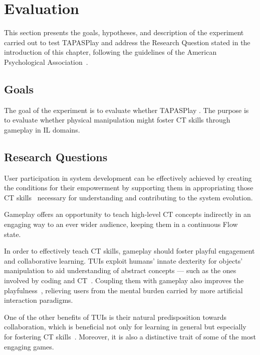 \section{Evaluation}\label{sec:ev5}
This section presents the goals, hypotheses, and description of the experiment carried out to test TAPASPlay and address the Research Question stated in the introduction of this chapter, following the guidelines of the American Psychological Association~\cite{Wohlin:2000:ESE:330775}.

\subsection{Goals}
The goal of the experiment is to evaluate whether TAPASPlay . The purpose is to evaluate whether physical manipulation might foster \ac{CT} skills through gameplay in \ac{IL} domains.

\subsection{Research Questions}
User participation in system development can be effectively achieved by creating the conditions for their empowerment by supporting them in appropriating those \ac{CT} skills~\cite{Wing:2006iz} necessary for understanding and contributing to the system evolution.

Gameplay offers an opportunity to teach high-level \ac{CT} concepts indirectly in an engaging way to an ever wider audience, keeping them in a continuous Flow state.

In order to effectively teach \ac{CT} skills, gameplay should foster playful engagement and collaborative learning. \acp{TUI} exploit humans' innate dexterity for objects' manipulation to aid understanding of abstract concepts --- such as the ones involved by coding and \ac{CT}~\cite{turchi2017tapas}. Coupling them with gameplay also improves the playfulness~\cite{PRICE2003169}, relieving users from the mental burden carried by more artificial interaction paradigms.

One of the other benefits of \acp{TUI} is their natural predisposition towards collaboration, which is beneficial not only for learning in general but especially for fostering \ac{CT} skills~\cite{Wang:2014jy}. Moreover, it is also a distinctive trait of some of the most engaging games.

